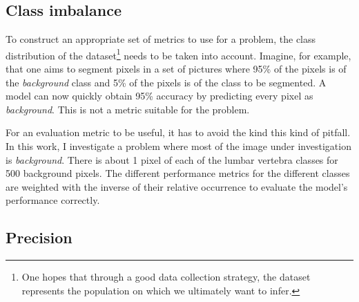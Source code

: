 \subsection{Class imbalance\label{sec:class_imbalance}}

To construct an appropriate set of metrics to use for a problem, the class distribution of the dataset\footnote{
    One hopes that through a good data collection strategy, the dataset represents the population on which we ultimately want to infer.

    } needs to be taken into account.
Imagine, for example, that one aims to segment pixels in a set of pictures where 95\% of the pixels is of the \textit{background} class and 5\% of the pixels is of the class to be segmented.
A model can now quickly obtain 95\% accuracy by predicting every pixel as \textit{background}. This is not a metric suitable for the problem.

For an evaluation metric to be useful, it has to avoid the kind this kind of pitfall.
In this work, I investigate a problem where most of the image under investigation is \textit{background}. 
There is about 1 pixel of each of the lumbar vertebra classes for 500 background pixels.
The different performance metrics for the different classes are weighted with the inverse of their relative occurrence to evaluate the model's performance correctly.
\newpage
\subsection{Precision}

